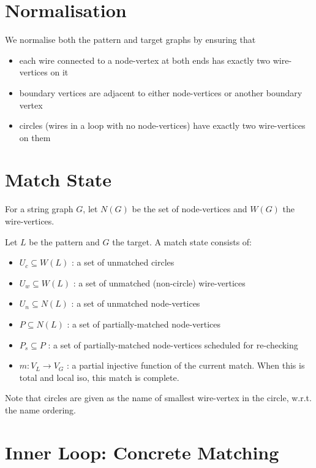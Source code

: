 \documentclass{article}
\begin{document}
\section{Normalisation}

We normalise both the pattern and target graphs by ensuring that
\begin{itemize}
\item each wire connected to a node-vertex at both ends has exactly two wire-vertices on it
\item boundary vertices are adjacent to either node-vertices or another boundary vertex
\item circles (wires in a loop with no node-vertices) have exactly two wire-vertices on them
\end{itemize}

\section{Match State}

For a string graph $G$, let $N(G)$ be the set of node-vertices and $W(G)$ the wire-vertices.

Let $L$ be the pattern and $G$ the target. A match state consists of:

\begin{itemize}
    \item $U_c \subseteq W(L)$ : a set of unmatched circles
    \item $U_w \subseteq W(L)$ : a set of unmatched (non-circle) wire-vertices
    \item $U_n \subseteq N(L)$ : a set of unmatched node-vertices
    \item $P \subseteq N(L)$ : a set of partially-matched node-vertices
    \item $P_s \subseteq P$ : a set of partially-matched node-vertices scheduled for re-checking
    \item $m : V_L \rightarrow V_G$ : a partial injective function of the current match. When this is total and local iso, this match is complete.
\end{itemize}

Note that circles are given as the name of smallest wire-vertex in the circle, w.r.t. the name ordering.

\section{Inner Loop: Concrete Matching}
\end{document}
